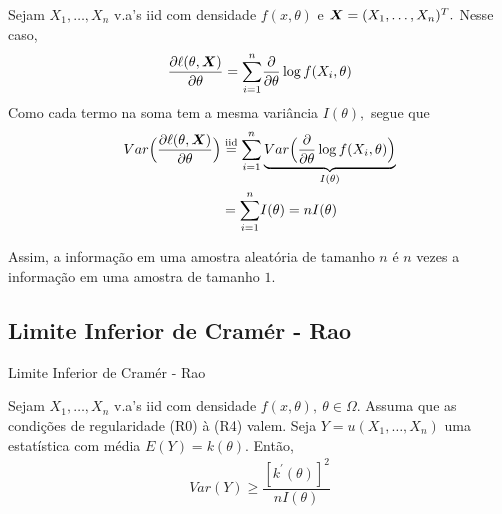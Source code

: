 \documentclass[12pt]{beamer}
\begin{document}
\begin{frame}{}
\begin{block}{}
\justifying
Sejam $X_{1},\ldots,X_{n}$ v.a's iid com densidade $f(x,\theta)$ e $\boldsymbol{X}=(X_{1},\ldots,X_{n})^{T}.$ Nesse caso,
\begin{align*}
    \dfrac{\partial\ell(\theta,\boldsymbol{X})}{\partial\theta}={\displaystyle \sum_{i=1}^{n}}\dfrac{\partial}{\partial\theta}\log{f(X_{i},\theta)}
\end{align*}
Como cada termo na soma tem a mesma variância $I(\theta),$ segue que 
\begin{align*}
    Var\Big(\dfrac{\partial\ell(\theta,\boldsymbol{X})}{\partial\theta}\Big)&\stackrel{\text{iid}}{=}{\displaystyle \sum_{i=1}^{n}} \underbrace{Var\Big(\dfrac{\partial}{\partial\theta}\log{f(X_{i},\theta)}\Big)}_{I(\theta)}\\
    &={\displaystyle \sum_{i=1}^{n}} I(\theta)=nI(\theta)
\end{align*}
\end{block}
\pause
\begin{block}{}
    Assim, a informação em uma amostra aleatória de tamanho $n$ é $n$ vezes a informação em uma amostra de tamanho $1.$
\end{block}
\end{frame}

\subsection{Limite Inferior de Cramér - Rao}
\begin{frame}{Limite Inferior de Cramér - Rao}
\begin{block}{}
\justifying
Sejam $X_{1},\ldots,X_{n}$ v.a's iid com densidade $f(x,\theta),~\theta\in \Omega.$ Assuma que as condições de regularidade (R0) à (R4) valem. Seja $Y=u(X_{1},\ldots,X_{n})$ uma estatística com média $E(Y)=k(\theta).$ Então, 
\begin{align*}
    Var(Y)\geq \dfrac{[k^{'}(\theta)]^{2}}{nI(\theta)}
\end{align*}
\end{block}
\end{frame}
\end{document}
